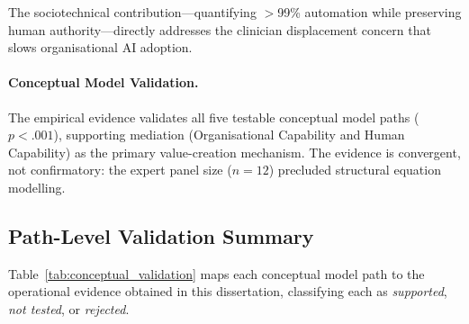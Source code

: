 \noindent The sociotechnical contribution---quantifying $>$99\% automation while preserving human authority---directly addresses the clinician displacement concern that slows organisational AI adoption.

\paragraph{Conceptual Model Validation.}

The empirical evidence validates all five testable conceptual model paths ($p < .001$), supporting mediation (Organisational Capability and Human Capability) as the primary value-creation mechanism. The evidence is convergent, not confirmatory: the expert panel size ($n = 12$) precluded structural equation modelling.

\subsection{Path-Level Validation Summary}

Table~\ref{tab:conceptual_validation} maps each conceptual model path to the operational evidence obtained in this dissertation, classifying each as \textit{supported}, \textit{not tested}, or \textit{rejected}.

